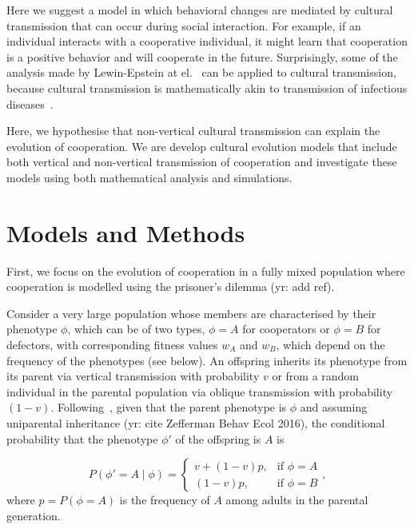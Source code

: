 \documentclass{article}
\begin{document}
Here we suggest a model in which behavioral changes are mediated by cultural transmission that can occur during social interaction. For example, if an individual interacts with a cooperative individual, it might learn that cooperation is a positive behavior and will cooperate in the future. Surprisingly, some of the analysis made by Lewin-Epstein at el.~\cite{lewin2017microbes} can be applied to cultural transmission, because cultural transmission is mathematically akin to transmission of infectious diseases~\cite{cavalli1981cultural}.

Here, we hypothesise that non-vertical cultural transmission can explain the evolution of cooperation. We are develop cultural evolution models that include both vertical and non-vertical transmission of cooperation and investigate these models using both mathematical analysis and simulations. 


\section*{Models and Methods}

First, we focus on the evolution of cooperation in a fully mixed population where cooperation is modelled using the prisoner's dilemma (yr: add ref).

Consider a very large population whose members are characterised by their phenotype $\phi$, which can be of two types, $\phi=A$ for cooperators or $\phi=B$ for defectors, with corresponding fitness values $w_A$ and $w_B$, which depend on the frequency of the phenotypes (see below).
An offspring inherits its phenotype from its parent via vertical transmission with probability $v$ or from a random individual in the parental population via oblique transmission with probability $(1-v)$. 
Following~\cite{ram2018evolution}, given that the parent phenotype is $\phi$ and assuming uniparental inheritance (yr: cite Zefferman Behav Ecol 2016), the conditional probability that the phenotype $\phi'$ of the offspring is $A$ is 

\begin{equation} \label{eq:vertical_oblique_transmission}
P(\phi'=A \mid \phi) = \begin{cases}
v + (1-v)p, & \text{if } \phi=A \\
(1-v)p, & \text{if } \phi=B
\end{cases},
\end{equation}
where $p=P(\phi=A)$ is the frequency of $A$ among adults in the parental generation.  
\end{document}
